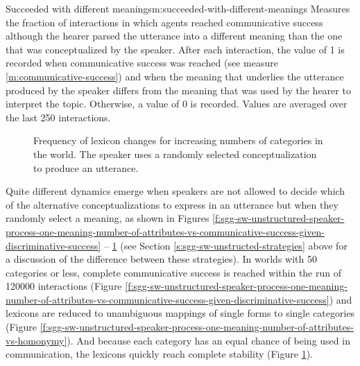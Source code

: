 \begin{measure}[b]{Succeeded with different
    meanings}{m:succeeded-with-different-meanings}
  Measures the fraction of interactions in which agents reached
  communicative success although the hearer parsed the utterance into a
  different meaning than the one that was conceptualized by the
  speaker. After each interaction, the value of 1 is recorded when
  communicative success was reached (see measure
  \ref{m:communicative-success}) and when the meaning that underlies
  the utterance produced by the speaker differs from the meaning that
  was used by the hearer to interpret the topic. Otherwise, a value of
  0 is recorded. Values are averaged over the last 250 interactions.
\end{measure}


\begin{figure}[t]
  \caption{Frequency of lexicon changes for increasing numbers of
    categories in the world. The speaker uses a randomly selected
    conceptualization to produce an utterance. }
  \label{f:sgg-sw-unstructured-speaker-process-one-meaning-number-of-attributes-vs-lexicon-changes}
\end{figure}

\stopfiguregroup


\noindent Quite different dynamics emerge when speakers are not
allowed to decide which of the alternative conceptualizations to
express in an utterance but when they randomly select a meaning, as
shown in Figures
\ref{f:sgg-sw-unstructured-speaker-process-one-meaning-number-of-attributes-vs-communicative-success-given-discriminative-success}
--
\ref{f:sgg-sw-unstructured-speaker-process-one-meaning-number-of-attributes-vs-lexicon-changes}
(see Section \ref{s:sgg-sw-unstructed-strategies} above for a
discussion of the difference between these strategies). In worlds with
50 categories or less, complete communicative success is reached
within the run of 120000 interactions (Figure
\ref{f:sgg-sw-unstructured-speaker-process-one-meaning-number-of-attributes-vs-communicative-success-given-discriminative-success})
and lexicons are reduced to unambiguous mappings of single forms to
single categories (Figure
\ref{f:sgg-sw-unstructured-speaker-process-one-meaning-number-of-attributes-vs-homonymy}). And
because each category has an equal chance of being used in
communication, the lexicons quickly reach complete stability (Figure
\ref{f:sgg-sw-unstructured-speaker-process-one-meaning-number-of-attributes-vs-lexicon-changes}).

